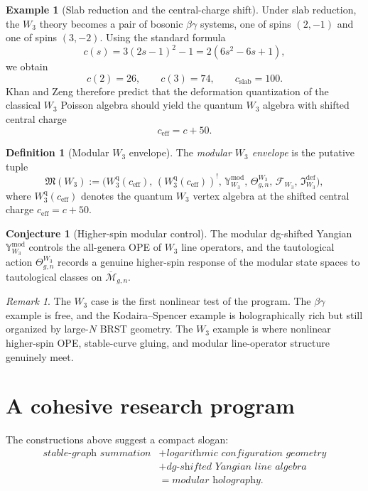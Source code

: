 \documentclass[11pt]{article}
\theoremstyle{definition}
\newtheorem{definition}[theorem]{Definition}
\newtheorem{conjecture}[theorem]{Conjecture}
\newtheorem{example}[theorem]{Example}
\theoremstyle{remark}
\newtheorem{remark}[theorem]{Remark}
\newcommand{\F}{\mathcal F}
\newcommand{\M}{\mathcal M}
\newcommand{\ModEnv}{\mathfrak M}
\newcommand{\modu}{\mathrm{mod}}
\newcommand{\eff}{\mathrm{eff}}
\newcommand{\defect}{\mathrm{def}}
\newcommand{\bbeta}{\beta}
\newcommand{\bgamma}{\gamma}
\begin{document}
\begin{example}[Slab reduction and the central-charge shift]\label{ex:w3-central-charge}
Under slab reduction, the $W_3$ theory becomes a pair of bosonic $\bbeta\bgamma$ systems, one of spins $(2,-1)$ and one of spins $(3,-2)$. Using the standard formula
\[
 c(s)=3(2s-1)^2-1 = 2(6s^2-6s+1),
\]
we obtain
\[
 c(2)=26,
 \qquad
 c(3)=74,
 \qquad
 c_{\mathrm{slab}}=100.
\]
Khan and Zeng therefore predict that the deformation quantization of the classical $W_3$ Poisson algebra should yield the quantum $W_3$ algebra with shifted central charge
\[
 c_{\eff}=c+50.
\]
\end{example}

\begin{definition}[Modular $W_3$ envelope]\label{def:modular-w3-envelope}
The \emph{modular $W_3$ envelope} is the putative tuple
\[
\ModEnv(W_3)
:=
\bigl(W_3^{\mathrm q}(c_{\eff}),\,(W_3^{\mathrm q}(c_{\eff}))^!,\,\mathbb Y_{W_3}^{\modu},\,\Theta_{g,n}^{W_3},\,\F_{W_3},\,\mathfrak I_{W_3}^{\defect}\bigr),
\]
where $W_3^{\mathrm q}(c_{\eff})$ denotes the quantum $W_3$ vertex algebra at the shifted central charge $c_{\eff}=c+50$.
\end{definition}

\begin{conjecture}[Higher-spin modular control]\label{conj:w3-higher-spin}
The modular dg-shifted Yangian $\mathbb Y_{W_3}^{\modu}$ controls the all-genera OPE of $W_3$ line operators, and the tautological action $\Theta_{g,n}^{W_3}$ records a genuine higher-spin response of the modular state spaces to tautological classes on $\overline{\M}_{g,n}$.
\end{conjecture}

\begin{remark}
The $W_3$ case is the first nonlinear test of the program. The $\bbeta\bgamma$ example is free, and the Kodaira--Spencer example is holographically rich but still organized by large-$N$ BRST geometry. The $W_3$ example is where nonlinear higher-spin OPE, stable-curve gluing, and modular line-operator structure genuinely meet.
\end{remark}

\section{A cohesive research program}\label{sec:program}

The constructions above suggest a compact slogan:
\[
\begin{aligned}
\textit{stable-graph summation} &+ \textit{logarithmic configuration geometry}\\[0.2em]
&+ \textit{dg-shifted Yangian line algebra}\\[0.2em]
&= \textit{modular holography}.
\end{aligned}
\]
\end{document}
